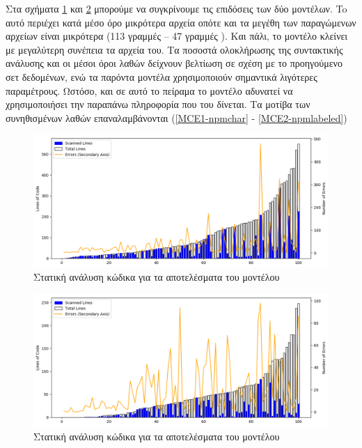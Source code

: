 

\pagebreak



Στα σχήματα \ref{static-npm-char} και \ref{static-npm-labeled} μπορούμε να συγκρίνουμε τις επιδόσεις των δύο μοντέλων.
To  αυτό περιέχει κατά μέσο όρο μικρότερα αρχεία οπότε και τα μεγέθη των παραγώμενων αρχείων είναι μικρότερα (113 γραμμές  -- 47 γραμμές ). 
Και πάλι, το  μοντέλο κλείνει με μεγαλύτερη συνέπεια τα αρχεία του.
Τα ποσοστά ολοκλήρωσης της συντακτικής ανάλυσης και οι μέσοι όροι λαθών δείχνουν βελτίωση σε σχέση με το προηγούμενο σετ δεδομένων, ενώ τα παρόντα μοντέλα χρησιμοποιούν σημαντικά λιγότερες παραμέτρους.
Ωστόσο, και σε αυτό το πείραμα το  μοντέλο αδυνατεί να χρησιμοποιήσει την παραπάνω πληροφορία που του δίνεται. Τα μοτίβα των συνηθισμένων λαθών επαναλαμβάνονται (\ref{MCE1-npmchar} - \ref{MCE2-npmlabeled})

\begin{figure}
	\includegraphics[width=\textwidth, keepaspectratio]{images/jshint-npmchar.png}
	\caption{Στατική ανάλυση κώδικα για τα αποτελέσματα του  μοντέλου}
	\label{static-npm-char}
\end{figure}

\begin{figure}
	\includegraphics[width=\textwidth, keepaspectratio]{images/jshint-npmlabeled.png}
	\caption{Στατική ανάλυση κώδικα για τα αποτελέσματα του  μοντέλου}
	\label{static-npm-labeled}
\end{figure}

